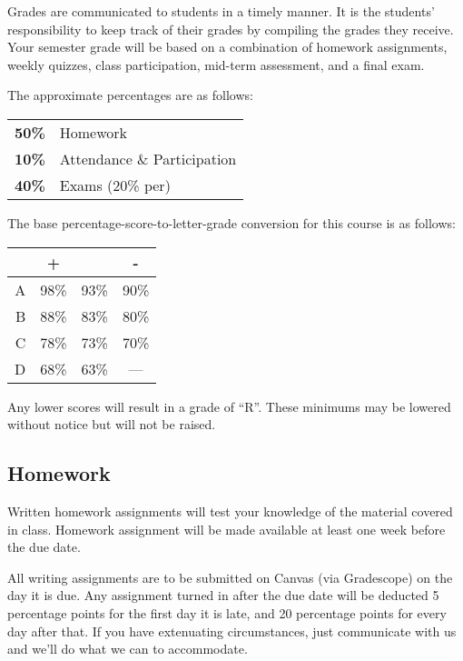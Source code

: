 \documentclass[12pt]{scrartcl}
\begin{document}
Grades are communicated to students in a timely manner. 
It is the students’ responsibility to keep track of their grades by compiling the grades they receive. 
Your semester grade will be based on a combination of homework assignments, weekly quizzes, class participation,  mid-term assessment, and a final exam. 

The approximate percentages are as follows:
\begin{center}
\begin{tabular}{rl}
\textbf{50\% } & Homework\\
\textbf{10\% } & Attendance \& Participation\\
\textbf{40\% } & Exams (20\% per)\\
\end{tabular}
\end{center}

The base percentage-score-to-letter-grade conversion for this course is as follows: 

\begin{center}
\begin{tabular}{r|ccc}
 & + & & -\\
 \hline
A & 98\% & 93\% & 90\%\\
B & 88\% & 83\% & 80\%\\
C & 78\% & 73\% & 70\%\\
D & 68\% & 63\% & ---\\
\end{tabular}
\end{center}
Any lower scores will result in a grade of ``R''.
These minimums may be lowered without notice but will not be raised. 

\subsection{Homework}

Written homework assignments will test your knowledge of the material covered in class. 
Homework assignment will be made available at least one week before the due date.

All writing assignments are to be submitted on Canvas (via Gradescope) on the day it is due.  
Any assignment turned in after the due date will be deducted 5 percentage points for the first day it is late, 
and 20 percentage points for every day after that.
If you have extenuating circumstances, just communicate with us and we'll do what we can to accommodate.  
\end{document}
